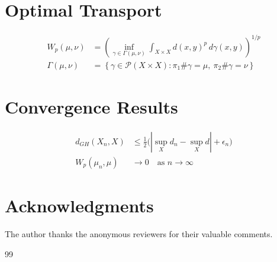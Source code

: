 \documentclass[reqno]{amsart}
\theoremstyle{plain}
\theoremstyle{definition}
\theoremstyle{note}
\theoremstyle{Proof}
\begin{document}
\section{Optimal Transport}

\begin{align}
  W_p(\mu,\nu) &= \left(\inf_{\gamma\in\Gamma(\mu,\nu)}
    \int_{X\times X} d(x,y)^p \, d\gamma(x,y)\right)^{1/p} \label{eq:ot} \\
  \Gamma(\mu,\nu) &= \left\{\gamma \in \mathcal{P}(X\times X) :
    \pi_1\#\gamma = \mu,\ \pi_2\#\gamma = \nu\right\} \label{eq:coupling}
\end{align}

\section{Convergence Results}

\begin{align}
  d_{GH}(X_n, X) &\le \frac{1}{2}\bigl(|\sup_X d_n - \sup_X d| + \epsilon_n\bigr) \label{eq:conv} \\
  W_p(\mu_n, \mu) &\to 0 \quad \text{as } n\to\infty \label{eq:wass}
\end{align}

\section*{Acknowledgments}

The author thanks the anonymous reviewers for their valuable comments.

\begin{thebibliography}{99}
\addtolength{\itemsep}{-0.5ex}


\end{thebibliography}
\end{document}
